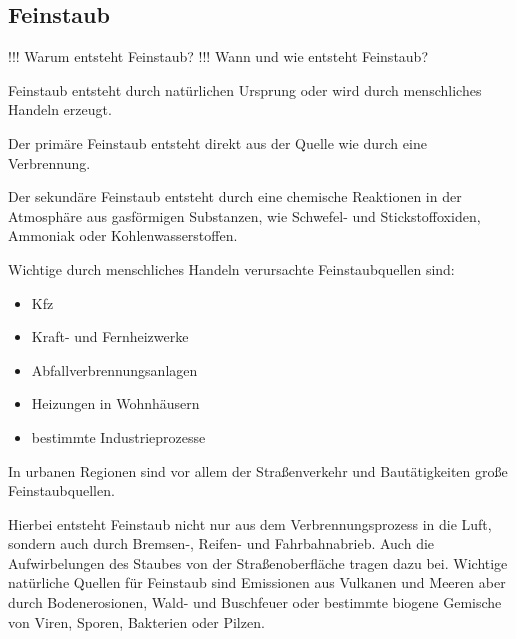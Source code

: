 \subsection{Feinstaub}
!!! Warum entsteht Feinstaub?
!!! Wann und wie entsteht Feinstaub?


Feinstaub entsteht durch natürlichen Ursprung oder wird durch menschliches Handeln erzeugt.


Der primäre Feinstaub entsteht direkt aus der Quelle wie durch eine Verbrennung.  

Der sekundäre Feinstaub entsteht durch eine chemische Reaktionen in der Atmosphäre aus gasförmigen Substanzen, 
wie Schwefel- und Stickstoffoxiden, Ammoniak oder Kohlenwasserstoffen.

Wichtige durch menschliches Handeln verursachte Feinstaubquellen sind: 
\begin{itemize}
	\item \ac{Kfz}
	\item Kraft- und Fernheizwerke
	\item Abfallverbrennungsanlagen
	\item Heizungen in Wohnhäusern
	\item bestimmte Industrieprozesse
\end{itemize}

In urbanen Regionen sind vor allem der Straßenverkehr und Bautätigkeiten große Feinstaubquellen.

Hierbei entsteht Feinstaub nicht nur aus dem Verbrennungsprozess in die Luft, sondern auch durch Bremsen-, Reifen- und Fahrbahnabrieb. 
Auch die Aufwirbelungen des Staubes von der Straßenoberfläche tragen dazu bei. 
Wichtige natürliche Quellen für Feinstaub sind Emissionen aus Vulkanen und Meeren aber durch Bodenerosionen, Wald- und Buschfeuer oder 
bestimmte biogene Gemische von Viren, Sporen, Bakterien oder Pilzen.

